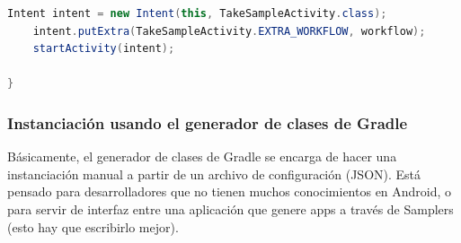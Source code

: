 \begin{itemize}
\begin{lstlisting}[language=Java, frame=tlb]
	Intent intent = new Intent(this, TakeSampleActivity.class);        
	intent.putExtra(TakeSampleActivity.EXTRA_WORKFLOW, workflow);
	startActivity(intent);
    	
}		
		\end{lstlisting}




\end{itemize}


\subsubsection{Instanciación usando el  generador de clases de Gradle}

Básicamente, el generador de clases de Gradle se encarga de hacer una instanciación manual a partir de un archivo de configuración (JSON). Está pensado para desarrolladores que no tienen muchos conocimientos en Android, o para servir de interfaz entre una aplicación que genere apps a través de Samplers (esto hay que escribirlo mejor).

